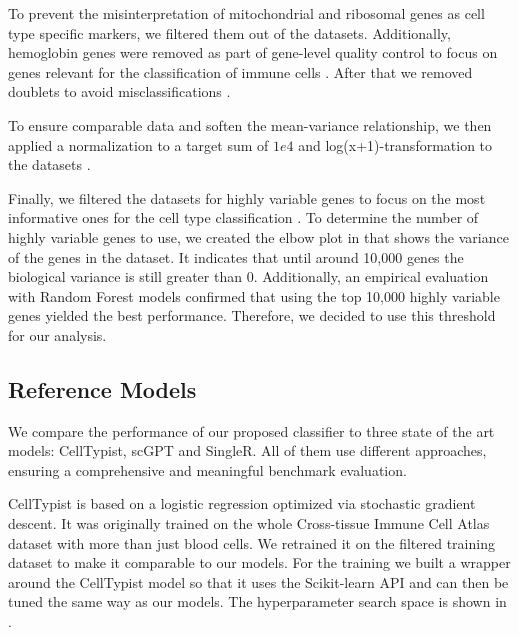 \documentclass[11pt]{article}
\begin{document}
To prevent the misinterpretation of mitochondrial and ribosomal genes as cell type specific markers, we filtered them out of the datasets. Additionally, hemoglobin genes were removed as part of gene-level quality control to focus on genes relevant for the classification of immune cells \cite{ding_systematic_2020, luecken_current_2019}. %
After that we removed doublets to avoid misclassifications \cite{scanpy_development_team_preprocessing_2026}.

To ensure comparable data and soften the mean-variance relationship, we then applied a normalization to a target sum of $1e4$ and log(x+1)-transformation to the datasets \cite{luecken_current_2019}.

Finally, we filtered the datasets for highly variable genes to focus on the most informative ones for the cell type classification \cite{scanpy_development_team_preprocessing_2026}. 
To determine the number of highly variable genes to use, we created the elbow plot in  that shows the variance of the genes in the dataset. It indicates that until around 10,000 genes the biological variance is still greater than 0. Additionally, an empirical evaluation with Random Forest models confirmed that using the top 10,000 highly variable genes yielded the best performance. Therefore, we decided to use this threshold for our analysis.


\subsection{Reference Models}\label{sec:methods:reference-models}

We compare the performance of our proposed classifier to three state of the art models: CellTypist, scGPT and SingleR. All of them use different approaches, ensuring a comprehensive and meaningful benchmark evaluation.


CellTypist \cite{dominguez_conde_cross-tissue_2022} is based on a logistic regression optimized via stochastic gradient descent. It was originally trained on the whole Cross-tissue Immune Cell Atlas dataset with more than just blood cells. We retrained it on the filtered training dataset to make it comparable to our models. For the training we built a wrapper around the CellTypist model so that it uses the Scikit-learn API and can then be tuned the same way as our models. The hyperparameter search space is shown in .
\end{document}

